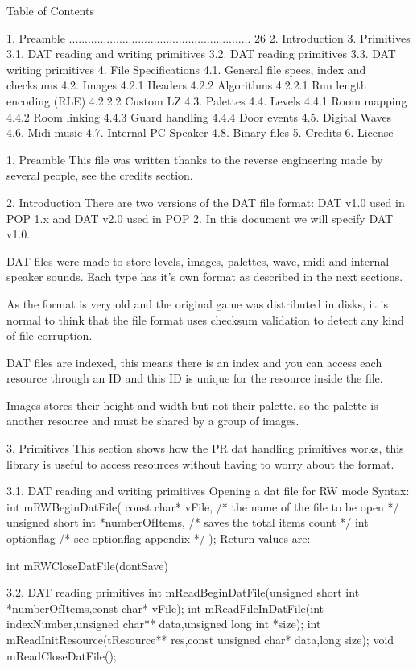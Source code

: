 Table of Contents

1. Preamble .......................................................... 26
2. Introduction
3. Primitives
3.1. DAT reading and writing primitives
3.2. DAT reading primitives
3.3. DAT writing primitives
4. File Specifications
4.1. General file specs, index and checksums
4.2. Images
4.2.1 Headers
4.2.2 Algorithms
4.2.2.1 Run length encoding (RLE)
4.2.2.2 Custom LZ
4.3. Palettes
4.4. Levels
4.4.1 Room mapping
4.4.2 Room linking
4.4.3 Guard handling
4.4.4 Door events 
4.5. Digital Waves
4.6. Midi music
4.7. Internal PC Speaker
4.8. Binary files
5. Credits
6. License

1. Preamble
 This file was written thanks to the reverse engineering made by several
 people, see the credits section.

2. Introduction
 There are two versions of the DAT file format: DAT v1.0 used in POP 1.x
 and DAT v2.0 used in POP 2. In this document we will specify DAT v1.0.

 DAT files were made to store levels, images, palettes, wave, midi and
 internal speaker sounds. Each type has it's own format as described in
 the next sections.
 
 As the format is very old and the original game was distributed in disks,
 it is normal to think that the file format uses checksum validation to
 detect any kind of file corruption.

 DAT files are indexed, this means there is an index and you can access
 each resource through an ID and this ID is unique for the resource inside
 the file.

 Images stores their height and width but not their palette, so the palette
 is another resource and must be shared by a group of images.

3. Primitives
 This section shows how the PR dat handling primitives works, this library
 is useful to access resources without having to worry about the format.

3.1. DAT reading and writing primitives
 Opening a dat file for RW mode
 Syntax:
 int mRWBeginDatFile(
  const char* vFile, /* the name of the file to be open */
  unsigned short int *numberOfItems, /* saves the total items count */
  int optionflag /* see optionflag appendix */
 );
 Return values are:

 int mRWCloseDatFile(dontSave)

3.2. DAT reading primitives
 int  mReadBeginDatFile(unsigned short int *numberOfItems,const char* vFile);
 int  mReadFileInDatFile(int indexNumber,unsigned char** data,unsigned long int
*size);
 int  mReadInitResource(tResource** res,const unsigned char* data,long size);
 void mReadCloseDatFile();

